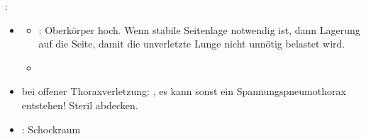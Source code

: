 \label{m:pneumothorax}
: 

\begin{itemize}
  \item \TxMassVitMKBes
  \begin{itemize}
    \item {}: Oberkörper hoch. Wenn stabile
    Seitenlage notwendig ist, dann Lagerung auf die
     Seite, damit die unverletzte
    Lunge  nicht unnötig belastet wird.
    \item {}
  \end{itemize}
  \item {} bei offener Thoraxverletzung: , es kann sonst ein
  Spannungspneumothorax entstehen! Steril abdecken.
  \item {}: Schockraum
\end{itemize}